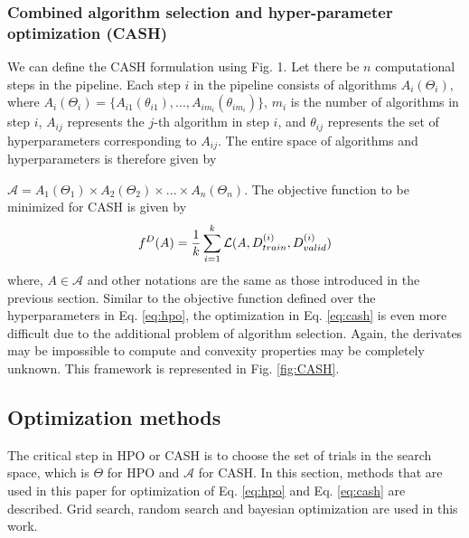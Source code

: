\subsubsection{Combined algorithm selection and hyper-parameter optimization (CASH)}
\label{subsubsec_CASH}
We can define the CASH formulation using Fig. 1. Let there be $n$ computational steps in the pipeline. Each step $i$ in the pipeline consists of algorithms $A_i(\Theta_i)$, where $A_i(\Theta_i) = \{A_{i1}(\theta_{i1}), ..., A_{im_{i}}(\theta_{im_{i}})\}$, $m_{i}$ is the number of algorithms in step $i$, $A_{ij}$ represents the $j$-th algorithm in step $i$, and \textbf{$\theta_{ij}$} represents the set of hyperparameters corresponding to  $A_{ij}$. The entire space of algorithms and hyperparameters is therefore given by \par
\noindent $\mathcal{A} = A_1(\Theta_1) \times A_2(\Theta_2) \times ... \times A_n(\Theta_n)$. The objective function to be minimized for CASH is given by
\begin{equation}
f^D(A) = \frac{1}{k}\sum_{i=1}^{k} \mathcal{L}(\emph{A}, D_{train}^{(i)}, D_{valid}^{(i)}) 
\label{eq:cash}
\end{equation}
where, $A \in \mathcal{A}$ and other notations are the same as those introduced in the previous section.
Similar to the objective function defined over the hyperparameters in Eq. \ref{eq:hpo}, the optimization in Eq. \ref{eq:cash} is even more difficult due to the additional problem of algorithm selection. Again, the derivates may be impossible to compute and convexity properties may be completely unknown. This framework is represented in Fig. \ref{fig:CASH}.



\subsection{Optimization methods}
\label{optimization}
The critical step in HPO or CASH is to choose the set of trials in the search space, which is $\Theta$ for HPO and $\mathcal{A}$ for CASH. In this section, methods that are used in this paper for optimization of Eq. \ref{eq:hpo} and Eq. \ref{eq:cash} are described. Grid search, random search and bayesian optimization are used in this work.
